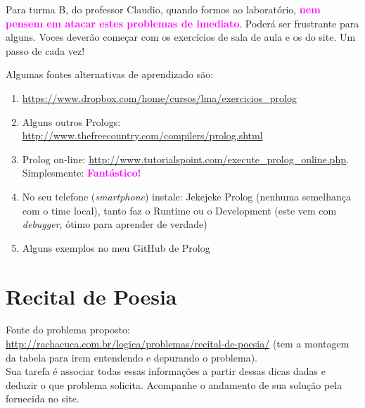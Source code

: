 \documentclass[a4paper,12pt]{article}
\begin{document}
\begin{center}

\vskip 2cm
{\Large
Para turma B, do professor Claudio, quando formos ao laboratório, \textbf{\textcolor{magenta}{nem pensem em atacar estes problemas de imediato}}. Poderá ser frustrante para alguns. Voces deverão começar com os exercícios de sala de aula e os do site. Um passo de cada vez!
}
\vskip 2cm
\end{center}

Algumas fontes alternativas de aprendizado s\~ao:

\begin{enumerate}

\item  \url{https://www.dropbox.com/home/cursos/lma/exercicios_prolog}

\item Alguns outros Prologs:  \url{http://www.thefreecountry.com/compilers/prolog.shtml}

\item Prolog on-line: \url{http://www.tutorialspoint.com/execute_prolog_online.php}. Simplesmente: \textbf{\textcolor{magenta}{Fantástico!}}

 \item No seu telefone (\emph{smartphone}) instale: Jekejeke Prolog (nenhuma semelhança com o time local), tanto faz o Runtime ou o Development (este vem com 
 \emph{debugger}, ótimo para aprender de verdade)
 
 \item Alguns exemplos no meu GitHub de Prolog

\end{enumerate}
\newpage
\tableofcontents


\newpage
\section{Recital de Poesia}

 Fonte do problema proposto:\\
 \url{http://rachacuca.com.br/logica/problemas/recital-de-poesia/}
 (tem a montagem da tabela para irem entendendo e depurando o problema).\\


\vspace{1.5cm}
 Sua tarefa é associar todas essas informações a partir dessas dicas dadas e deduzir o que problema solicita. Acompanhe o andamento de sua solução pela fornecida no site.
\newpage
\end{document}
